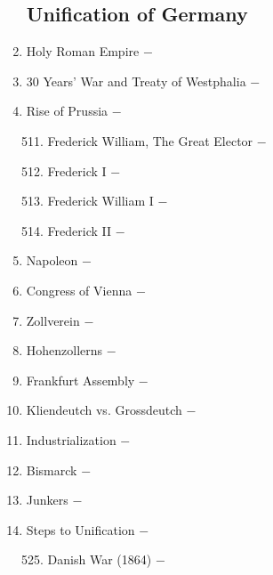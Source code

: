 \documentclass[12pt]{article}
\begin{document}
\begin{enumerate}
\subsection{Unification of Germany}

\item Holy Roman Empire $-$ 

\item 30 Years' War and Treaty of Westphalia $-$ 

\item Rise of Prussia $-$ 

\begin{enumerate}[label=\arabic{*}.]
\setcounter{enumii}{510}

\item Frederick William, The Great Elector $-$ 

\item Frederick I $-$ 

\item Frederick William I $-$ 

\item Frederick II $-$ 

\end{enumerate}
\setcounter{enumi}{514}

\item Napoleon $-$ 

\item Congress of Vienna $-$ 

\item Zollverein $-$ 

\item Hohenzollerns $-$ 

\item Frankfurt Assembly $-$ 

\item Kliendeutch vs. Grossdeutch $-$ 

\item Industrialization $-$ 

\item Bismarck $-$ 

\item Junkers $-$ 

\item Steps to Unification $-$ 

\begin{enumerate}[label=\arabic{*}.]
\setcounter{enumii}{524}

\item Danish War (1864) $-$ 


\end{enumerate}
\end{enumerate}
\end{document}

